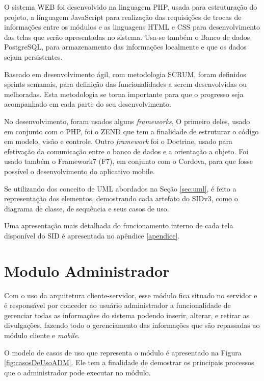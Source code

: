 O sistema WEB foi desenvolvido na linguagem PHP, usada para estruturação do projeto, a linguagem JavaScript para realização das requisições de trocas de informações entre os módulos e as linguagens HTML e CSS para desenvolvimento das telas que serão apresentadas no sistema. Usa-se também o Banco de dados PostgreSQL, para armazenamento das informações localmente e que os dados sejam persistentes.

Baseado em desenvolvimento ágil, com metodologia SCRUM, foram definidos sprints semanais, para definição das funcionalidades a serem desenvolvidas ou melhoradas. Esta metodologia se torna importante para que o progresso seja acompanhado em cada parte do seu desenvolvimento.

No desenvolvimento, foram usados alguns \textit{frameworks}, O primeiro deles, usado em conjunto com o PHP, foi o ZEND que tem a finalidade de estruturar o código em modelo, visão e controle. Outro \textit{framework} foi o Doctrine, usado para efetivação da comunicação entre o banco de dados e a orientação a objeto. Foi usado também o Framework7 (F7), em conjunto com o Cordova, para que fosse possível o desenvolvimento do aplicativo mobile. 

Se utilizando dos conceito de UML abordados na Seção \ref{sec:uml}, é  feito a representação dos elementos, demostrando cada artefato do SIDv3, como o diagrama de classe, de sequência e seus casos de uso.

Uma apresentação mais detalhada do funcionamento interno de cada tela disponível do SID é apresentada no apêndice \ref{apendice}.

\section{Modulo Administrador}
Com o uso da arquitetura cliente-servidor, esse módulo fica situado no servidor e é responsável por conceder ao usuário administrador a funcionalidade de gerenciar todas as informações do sistema podendo inserir, alterar, e retirar as divulgações, fazendo todo o gerenciamento das informações que são repassadas ao módulo cliente e \textit{mobile}.

O modelo de casos de uso que representa o módulo é apresentado na Figura \ref{fig:casosDeUsoADM}. Ele tem a finalidade de demostrar os principais processos que o administrador pode executar no módulo.

